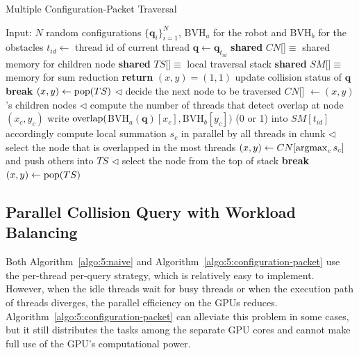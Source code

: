 \begin{algorithm}[htb]
    \caption{Multiple Configuration-Packet Traversal}
    \label{algo:5:configuration-packet}
    \begin{algorithmic}[1]
    \STATE Input: $N$ random configurations $\{\mathbf{q}_i\}_{i=1}^N$, BVH$_a$ for the robot and BVH$_b$ for the obstacles
    \STATE $t_{id} \leftarrow$ thread id of current thread
    \STATE $\mathbf{q} \leftarrow \mathbf{q}_{t_{id}}$
    \STATE \textbf{shared} $CN$[]$\equiv$ shared memory for children node
    \STATE \textbf{shared} $TS$[]$\equiv$ local traversal stack
    \STATE \textbf{shared} $SM$[]$\equiv$ memory for sum reduction
    \medskip
        \STATE \textbf{return}
    \ENDIF
    \STATE $(x,y) = (1,1)$
    \LOOP
            \STATE update collision status of $\mathbf{q}$
        \ENDIF
            \STATE \textbf{break}
        \ENDIF
        \STATE $(x,y) \leftarrow \operatorname{pop}(TS)$
        \ELSE \STATE $\lhd$ decide the next node to be traversed
            \STATE $CN$[] $\leftarrow (x,y)$'s children nodes
            \STATE $\lhd$ compute the number of threads that detect overlap at node $(x_c, y_c)$
            \STATE write $\operatorname{overlap}($BVH$_a(\mathbf{q})[x_c],$BVH$_b[y_c])$ (0 or 1) into $SM[t_{id}]$ accordingly
            \STATE compute local summation $s_c$ in parallel by all threads in chunk
            \ENDFOR
            \STATE $\lhd$ select the node that is overlapped in the most threads
            \STATE $(x,y) \leftarrow CN[\operatorname{argmax}_c{s_c}]$ and push others into $TS$
            \ELSE
            \STATE $\lhd$ select the node from the top of stack
                    \STATE \textbf{break}
                \ENDIF
                \STATE $(x,y) \leftarrow \operatorname{pop}(TS)$
            \ENDIF
        \ENDIF
    \ENDLOOP
    \end{algorithmic}
\end{algorithm}


\subsection{Parallel Collision Query with Workload Balancing}
Both Algorithm~\ref{algo:5:naive} and Algorithm~\ref{algo:5:configuration-packet} use the per-thread per-query strategy, which is relatively easy to implement. However, when the idle threads wait for busy threads or when the execution path of threads diverges, the parallel
efficiency on the GPUs reduces. Algorithm~\ref{algo:5:configuration-packet} can alleviate this problem in some cases, but it still distributes the tasks among the separate GPU cores and cannot make full use of the GPU's computational power.

